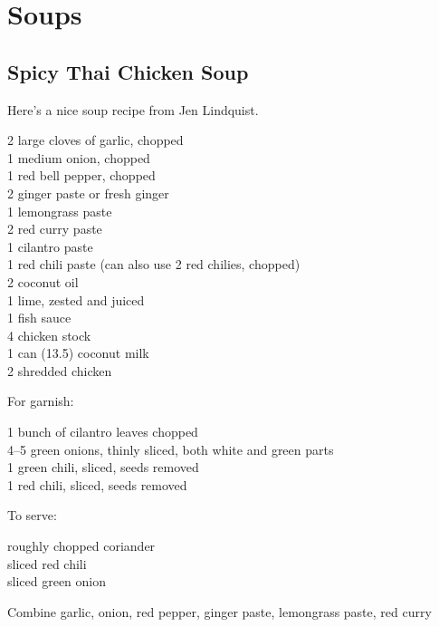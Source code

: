 \chapter{Soups}

\section{Spicy Thai Chicken Soup}

\begin{open}
    Here's a nice soup recipe from Jen Lindquist.
\end{open}
\begin{ingredients}
    2 large cloves of garlic, chopped\\
    1 medium onion, chopped\\
    1 red bell pepper, chopped\\
    \SI{2}{\tblspoon} ginger paste or fresh ginger\\
    \SI{1}{\tblspoon} lemongrass paste\\
    \SI{2}{\tblspoon} red curry paste\\
    \SI{1}{\tblspoon} cilantro paste\\
    \SI{1}{\tblspoon} red chili paste (can also use 2 red chilies, chopped)\\
    \SI{2}{\tblspoon} coconut oil\\
    1 lime, zested and juiced\\
    \SI{1}{\tblspoon} fish sauce\\
    \SI{4}{\cup} chicken stock\\
    1 can (\SI{13.5}{\fluidounce}) coconut milk\\
    \SI{2}{\cup} shredded chicken
\end{ingredients}
For garnish:
\begin{ingredients}
    1 bunch of cilantro leaves chopped\\
    \numrange{4}{5} green onions, thinly sliced, both white and green parts\\
    1 green chili, sliced, seeds removed\\
    1 red chili, sliced, seeds removed
\end{ingredients}
To serve:
\begin{ingredients}
    roughly chopped coriander\\
    sliced red chili\\
    sliced green onion
\end{ingredients}
Combine garlic, onion, red pepper, ginger paste, lemongrass paste, red curry
